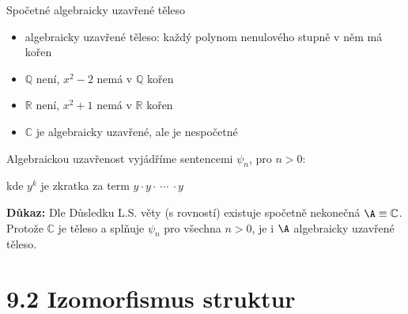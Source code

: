 \documentclass{beamer}
\begin{document}
\begin{frame}{Spočetné algebraicky uzavřené těleso}

    \begin{itemize}
        \item \alert{algebraicky uzavřené} těleso: každý polynom nenulového stupně v něm má kořen
        \item $\mathbb Q$ není, $x^2-2$ nemá v $\mathbb Q$ kořen
        \item $\mathbb R$ není, $x^2+1$ nemá v $\mathbb R$ kořen
        \item $\mathbb C$ je algebraicky uzavřené, ale je nespočetné
    \end{itemize}

    Algebraickou uzavřenost vyjádříme sentencemi $\psi_n$, pro $n>0$:
    

    kde $y^k$ je zkratka za term $y\cdot y \cdot\ \cdots\ \cdot y$


    \smallskip

    \textbf{Důkaz:}
    Dle Důsledku L.S. věty (s rovností) existuje spočetně nekonečná $\A\equiv\mathbb C$. Protože $\mathbb C$ je těleso a splňuje $\psi_n$ pro všechna $n>0$, je i $\A$ algebraicky uzavřené těleso.\hfill\qedsymbol

\end{frame}


\section{9.2 Izomorfismus struktur}
\end{document}
